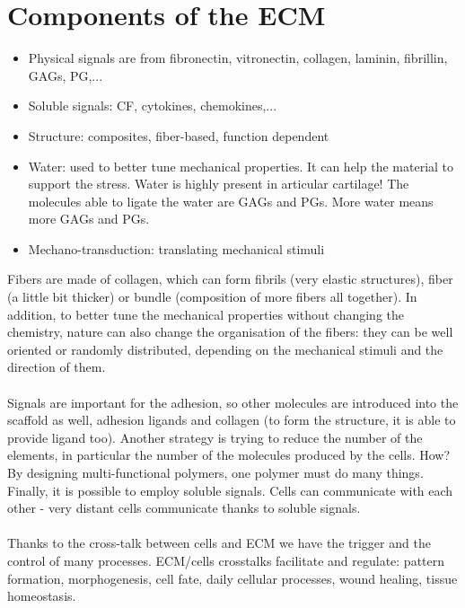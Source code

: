 \section{Components of the ECM}
\begin{itemize}
\item Physical signals are from fibronectin, vitronectin, collagen, laminin, fibrillin, GAGs, PG,...
\item Soluble signals: CF, cytokines, chemokines,...
\item Structure: composites, fiber-based, function dependent
\item Water: used to better tune mechanical properties. It can help the material to support the stress. Water is highly present in articular cartilage! The molecules able to ligate the water are GAGs and PGs. More water means more GAGs and PGs.
\item Mechano-transduction: translating mechanical stimuli
\end{itemize}
\noindent
Fibers are made of collagen, which can form fibrils (very elastic structures), fiber (a little bit thicker) or bundle (composition of more fibers all together). In addition, to better tune the mechanical properties without changing the chemistry, nature can also change the organisation of the fibers: they can be well oriented or randomly distributed, depending on the mechanical stimuli and the direction of them.
\\
\\
\noindent
Signals are important for the adhesion, so other molecules are introduced into the scaffold as well, adhesion ligands and collagen (to form the structure, it is able to provide ligand too).
Another strategy is trying to reduce the number of the elements, in particular the number of the molecules produced by the cells. How? By designing multi-functional polymers, one polymer must do many things. Finally, it is possible to employ soluble signals. Cells can communicate with each other - very distant cells communicate thanks to soluble signals.
\\
\\
\noindent
Thanks to the cross-talk between cells and ECM we have the trigger and the control of many processes. ECM/cells crosstalks facilitate and regulate: pattern formation, morphogenesis, cell fate, daily cellular processes, wound healing, tissue homeostasis.

